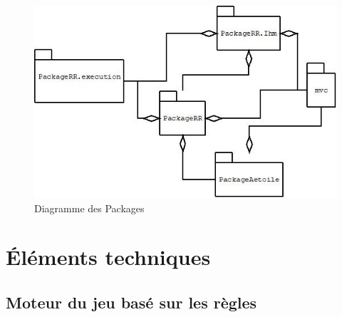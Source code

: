 \documentclass[12pt]{article}
\begin{document}
			\newpage
		\begin{figure}[htpb]
			\includegraphics[scale=0.9]{./images/p.jpg}
			\caption{Diagramme des Packages}
		\end{figure}
		\newpage
			
		\section{Éléments techniques}
			\subsection{Moteur du jeu basé sur les règles}
			
\end{document}
